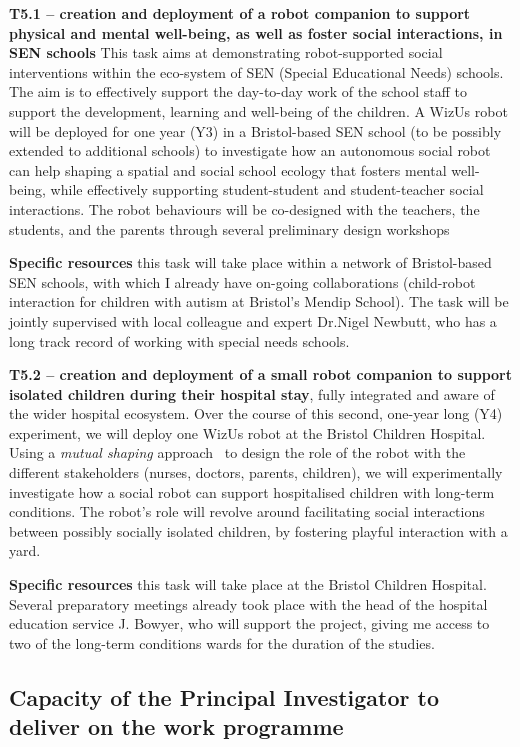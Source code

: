 \documentclass[11pt,a4paper]{report}
\newcommand{\project}{WizUs\xspace}
\begin{document}
\textbf{T5.1 -- creation and deployment of a robot companion to
support physical and mental well-being, as well as foster social interactions,
in SEN schools} This task aims at demonstrating robot-supported social
interventions within the eco-system of SEN (Special Educational Needs)
schools. The aim is to effectively support the day-to-day work of the
school staff to support the development, learning and well-being of the
children. A \project robot will be deployed for one year (Y3) in a
Bristol-based SEN school (to be possibly extended to additional schools) to
investigate how an autonomous social robot can help shaping a spatial and social
school ecology that fosters mental well-being, while effectively supporting
student-student and student-teacher social interactions. The
robot behaviours will be co-designed with the teachers, the students, and the
parents through several preliminary design workshops

\textbf{Specific resources} this task will take place within a network of
Bristol-based SEN schools, with which I already have on-going collaborations
(child-robot interaction for children with autism at Bristol's Mendip School).
The task will be jointly supervised with local colleague and expert Dr.Nigel Newbutt,
who has a long track record of working with special needs schools.


\textbf{T5.2 -- creation and deployment of a small robot companion to support
isolated children during their hospital stay}, fully integrated and aware of the
wider hospital ecosystem. Over the course of this second, one-year long (Y4)
experiment, we will deploy one \project robot at the Bristol Children Hospital.
Using a \emph{mutual shaping} approach~\cite{winkle2018social} to design the
role of the robot with the different stakeholders (nurses, doctors, parents,
children), we will experimentally investigate how a social robot can support
hospitalised children with long-term conditions. The robot's role will revolve
around facilitating social interactions between possibly socially isolated
children, by fostering playful interaction with a yard.

\textbf{Specific resources} this task will take place at the Bristol Children
Hospital. Several preparatory meetings already took place with the head of the
hospital education service J. Bowyer, who will support the project, giving me
access to two of the long-term conditions wards for the duration of the studies.



\subsection{Capacity of the Principal Investigator to deliver on the work programme}
\end{document}
